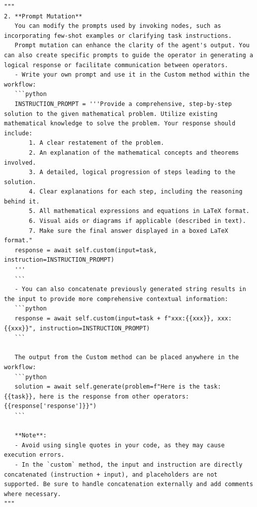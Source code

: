 \documentclass{article}
\theoremstyle{plain}
\theoremstyle{definition}
\theoremstyle{remark}
\begin{document}
\begin{tcolorbox}[notitle, sharp corners, breakable, colframe=YellowGreen, colback=white, 
       boxrule=3pt, boxsep=0.5pt, enhanced, 
       shadow={3pt}{-3pt}{0pt}{opacity=1,mygrey},
       title={Prompt Mutation},]
       \footnotesize
       {\selectfont
\begin{lstlisting}
"""
2. **Prompt Mutation**  
   You can modify the prompts used by invoking nodes, such as incorporating few-shot examples or clarifying task instructions.  
   Prompt mutation can enhance the clarity of the agent's output. You can also create specific prompts to guide the operator in generating a logical response or facilitate communication between operators. 
   - Write your own prompt and use it in the Custom method within the workflow:
   ```python
   INSTRUCTION_PROMPT = '''Provide a comprehensive, step-by-step solution to the given mathematical problem. Utilize existing mathematical knowledge to solve the problem. Your response should include: 
       1. A clear restatement of the problem.
       2. An explanation of the mathematical concepts and theorems involved.
       3. A detailed, logical progression of steps leading to the solution.
       4. Clear explanations for each step, including the reasoning behind it.
       5. All mathematical expressions and equations in LaTeX format.
       6. Visual aids or diagrams if applicable (described in text).
       7. Make sure the final answer displayed in a boxed LaTeX format."
   response = await self.custom(input=task, instruction=INSTRUCTION_PROMPT)
   '''
   ```
   - You can also concatenate previously generated string results in the input to provide more comprehensive contextual information:
   ```python
   response = await self.custom(input=task + f"xxx:{{xxx}}, xxx:{{xxx}}", instruction=INSTRUCTION_PROMPT)
   ```

   The output from the Custom method can be placed anywhere in the workflow:
   ```python
   solution = await self.generate(problem=f"Here is the task: {{task}}, here is the response from other operators:{{response['response']}}")
   ```

   **Note**:
   - Avoid using single quotes in your code, as they may cause execution errors.
   - In the `custom` method, the input and instruction are directly concatenated (instruction + input), and placeholders are not supported. Be sure to handle concatenation externally and add comments where necessary.
"""
\end{lstlisting}
}
\end{tcolorbox}
\end{document}
